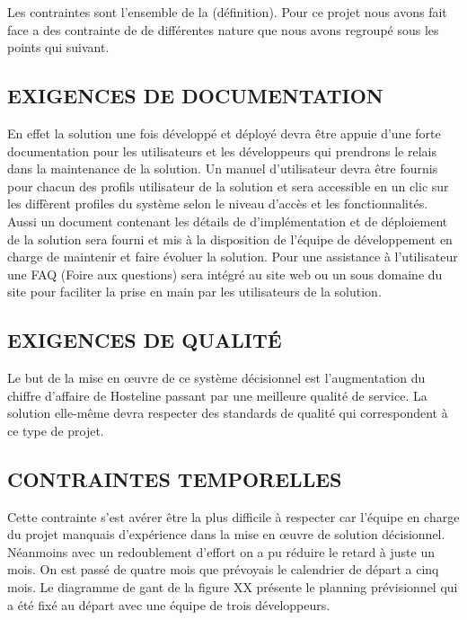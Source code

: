  Les contraintes sont l’ensemble de la (définition). Pour ce projet nous avons fait face a des contrainte de de différentes nature que nous avons regroupé sous les points qui suivant.\\
 
 \subsection{EXIGENCES DE DOCUMENTATION}
 
 En effet la solution une fois développé et déployé devra être appuie d’une forte documentation pour les utilisateurs et les développeurs qui prendrons le relais dans la maintenance de la solution. Un manuel d’utilisateur devra être fournis pour chacun des profils utilisateur de la solution et sera accessible en un clic sur les diffèrent profiles du système selon le niveau d’accès et les fonctionnalités. Aussi un document contenant les détails de d’implémentation et de déploiement de la solution sera fourni et mis à la disposition de l’équipe de développement en charge de maintenir et faire évoluer la solution. Pour une assistance à l’utilisateur une FAQ (Foire aux questions) sera intégré au site web ou un sous domaine du site pour faciliter la prise en main par les utilisateurs de la solution.\\
 
 \subsection{EXIGENCES DE QUALITÉ}
 
 Le but de la mise en œuvre de ce système décisionnel est l’augmentation du chiffre d’affaire de Hosteline passant par une meilleure qualité de service. La solution elle-même devra respecter des standards de qualité qui correspondent à ce type de projet.\\
 
 
 \subsection{CONTRAINTES TEMPORELLES}
 
 Cette contrainte s’est avérer être la plus difficile à respecter car l’équipe en charge du projet manquais d’expérience dans la mise en œuvre de solution décisionnel. Néanmoins avec un redoublement d’effort on a pu réduire le retard à juste un mois. On est passé de quatre mois que prévoyais le calendrier de départ a cinq mois. Le diagramme de gant de la figure XX présente le planning prévisionnel qui a été fixé au départ avec une équipe de trois développeurs. 
 
